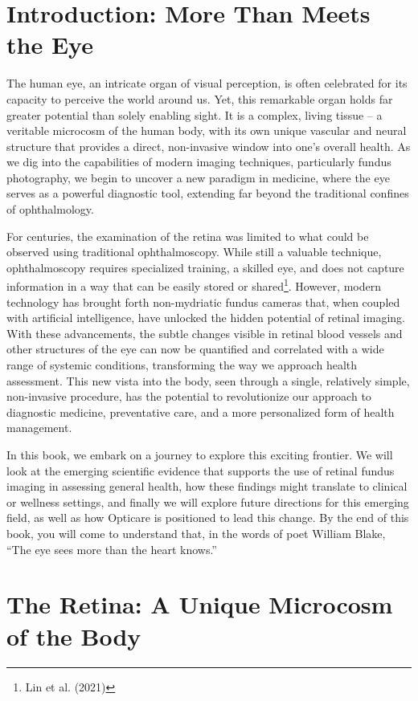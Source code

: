 \documentclass[
  Letterpaper,
]{scrbook}
\begin{document}
\section{Introduction: More Than Meets the
Eye}\label{introduction-more-than-meets-the-eye}

The human eye, an intricate organ of visual perception, is often
celebrated for its capacity to perceive the world around us. Yet, this
remarkable organ holds far greater potential than solely enabling sight.
It is a complex, living tissue -- a veritable microcosm of the human
body, with its own unique vascular and neural structure that provides a
direct, non-invasive window into one's overall health. As we dig into
the capabilities of modern imaging techniques, particularly fundus
photography, we begin to uncover a new paradigm in medicine, where the
eye serves as a powerful diagnostic tool, extending far beyond the
traditional confines of ophthalmology.

For centuries, the examination of the retina was limited to what could
be observed using traditional ophthalmoscopy. While still a valuable
technique, ophthalmoscopy requires specialized training, a skilled eye,
and does not capture information in a way that can be easily stored or
shared\footnote{Lin et al. (2021)}. However, modern technology has
brought forth non-mydriatic fundus cameras that, when coupled with
artificial intelligence, have unlocked the hidden potential of retinal
imaging. With these advancements, the subtle changes visible in retinal
blood vessels and other structures of the eye can now be quantified and
correlated with a wide range of systemic conditions, transforming the
way we approach health assessment. This new vista into the body, seen
through a single, relatively simple, non-invasive procedure, has the
potential to revolutionize our approach to diagnostic medicine,
preventative care, and a more personalized form of health management.

In this book, we embark on a journey to explore this exciting frontier.
We will look at the emerging scientific evidence that supports the use
of retinal fundus imaging in assessing general health, how these
findings might translate to clinical or wellness settings, and finally
we will explore future directions for this emerging field, as well as
how Opticare is positioned to lead this change. By the end of this book,
you will come to understand that, in the words of poet William Blake,
``The eye sees more than the heart knows.''

\section{The Retina: A Unique Microcosm of the
Body}\label{the-retina-a-unique-microcosm-of-the-body}
\end{document}
